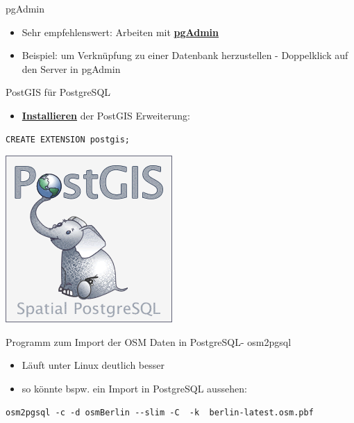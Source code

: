 \documentclass[ignorenonframetext,]{beamer}
\providecommand{\tightlist}{%
  \setlength{\itemsep}{0pt}\setlength{\parskip}{0pt}}
\begin{document}
\begin{frame}{pgAdmin}
\protect\hypertarget{pgadmin}{}

\begin{itemize}
\tightlist
\item
  Sehr empfehlenswert: Arbeiten mit
  \href{https://www.pgadmin.org/}{\textbf{pgAdmin}}
\item
  Beispiel: um Verknüpfung zu einer Datenbank herzustellen - Doppelklick
  auf den Server in pgAdmin
\end{itemize}

\end{frame}

\begin{frame}[fragile]{PostGIS für PostgreSQL}
\protect\hypertarget{postgis-fur-postgresql}{}

\begin{itemize}
\tightlist
\item
  \href{http://postgis.net/install/}{\textbf{Installieren}} der PostGIS
  Erweiterung:
\end{itemize}

\begin{verbatim}
CREATE EXTENSION postgis;
\end{verbatim}

\includegraphics{figure/PostGIS_logo.png}

\end{frame}

\begin{frame}[fragile]{Programm zum Import der OSM Daten in PostgreSQL-
osm2pgsql}
\protect\hypertarget{programm-zum-import-der-osm-daten-in-postgresql--osm2pgsql}{}

\begin{itemize}
\tightlist
\item
  Läuft unter Linux deutlich besser
\item
  so könnte bspw. ein Import in PostgreSQL aussehen:
\end{itemize}

\begin{verbatim}
osm2pgsql -c -d osmBerlin --slim -C  -k  berlin-latest.osm.pbf
\end{verbatim}

\end{frame}
\end{document}
